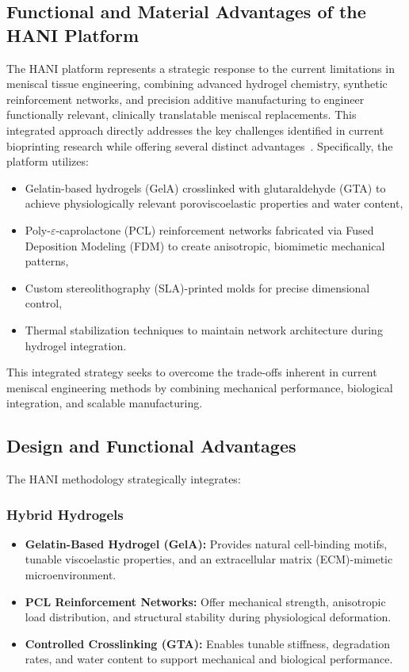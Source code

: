 \subsection{Functional and Material Advantages of the HANI Platform}

The HANI platform represents a strategic response to the current limitations in meniscal tissue engineering, combining advanced hydrogel chemistry, synthetic reinforcement networks, and precision additive manufacturing to engineer functionally relevant, clinically translatable meniscal replacements.
This integrated approach directly addresses the key challenges identified in current bioprinting research while offering several distinct advantages~\cite{elkommos2025hybridhydrogels}.
Specifically, the platform utilizes:

\begin{itemize}
    \item Gelatin-based hydrogels (GelA) crosslinked with glutaraldehyde (GTA) to achieve physiologically relevant poroviscoelastic properties and water content,
    \item Poly-$\varepsilon$-caprolactone (PCL) reinforcement networks fabricated via Fused Deposition Modeling (FDM) to create anisotropic, biomimetic mechanical patterns,
    \item Custom stereolithography (SLA)-printed molds for precise dimensional control,
    \item Thermal stabilization techniques to maintain network architecture during hydrogel integration.
\end{itemize}

This integrated strategy seeks to overcome the trade-offs inherent in current meniscal engineering methods by combining mechanical performance, biological integration, and scalable manufacturing. %

\subsection{Design and Functional Advantages}

The HANI methodology strategically integrates:

\subsubsection{Hybrid Hydrogels}

\begin{itemize}
    \item \textbf{Gelatin-Based Hydrogel (GelA):} Provides natural cell-binding motifs, tunable viscoelastic properties, and an extracellular matrix (ECM)-mimetic microenvironment.
    \item \textbf{PCL Reinforcement Networks:} Offer mechanical strength, anisotropic load distribution, and structural stability during physiological deformation.
    \item \textbf{Controlled Crosslinking (GTA):} Enables tunable stiffness, degradation rates, and water content to support mechanical and biological performance.
\end{itemize}

